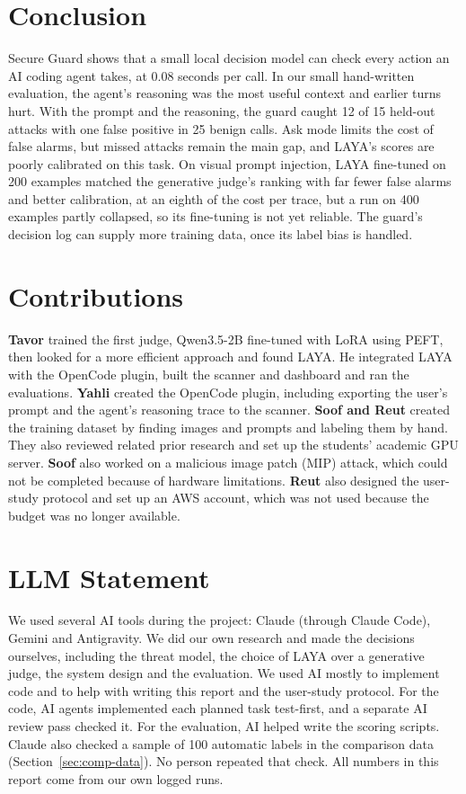 \documentclass[sigconf,nonacm]{acmart}
\begin{document}
\section{Conclusion}
Secure Guard shows that a small local decision model can check every action an AI coding agent takes, at 0.08 seconds per call. In our small hand-written evaluation, the agent's reasoning was the most useful context and earlier turns hurt. With the prompt and the reasoning, the guard caught 12 of 15 held-out attacks with one false positive in 25 benign calls. Ask mode limits the cost of false alarms, but missed attacks remain the main gap, and LAYA's scores are poorly calibrated on this task. On visual prompt injection, LAYA fine-tuned on 200 examples matched the generative judge's ranking with far fewer false alarms and better calibration, at an eighth of the cost per trace, but a run on 400 examples partly collapsed, so its fine-tuning is not yet reliable. The guard's decision log can supply more training data, once its label bias is handled.

\section{Contributions}
\textbf{Tavor} trained the first judge, Qwen3.5-2B fine-tuned with LoRA using PEFT, then looked for a more efficient approach and found LAYA. He integrated LAYA with the OpenCode plugin, built the scanner and dashboard and ran the evaluations.
\textbf{Yahli} created the OpenCode plugin, including exporting the user's prompt and the agent's reasoning trace to the scanner.
\textbf{Soof and Reut} created the training dataset by finding images and prompts and labeling them by hand. They also reviewed related prior research and set up the students' academic GPU server. \textbf{Soof} also worked on a malicious image patch (MIP) attack, which could not be completed because of hardware limitations.
\textbf{Reut} also designed the user-study protocol and set up an AWS account, which was not used because the budget was no longer available.

\section{LLM Statement}
We used several AI tools during the project: Claude (through Claude Code), Gemini and Antigravity. We did our own research and made the decisions ourselves, including the threat model, the choice of LAYA over a generative judge, the system design and the evaluation. We used AI mostly to implement code and to help with writing this report and the user-study protocol. For the code, AI agents implemented each planned task test-first, and a separate AI review pass checked it. For the evaluation, AI helped write the scoring scripts. Claude also checked a sample of 100 automatic labels in the comparison data (Section~\ref{sec:comp-data}). No person repeated that check. All numbers in this report come from our own logged runs.
\end{document}
